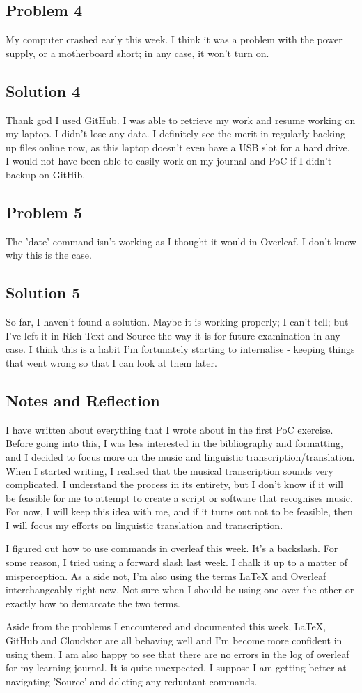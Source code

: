 \documentclass{article}
\begin{document}
\subsection{Problem 4}
My computer crashed early this week. I think it was a problem with the power supply, or a motherboard short; in any case, it won't turn on.
\subsection{Solution 4}
Thank god I used GitHub. I was able to retrieve my work and resume working on my laptop. I didn't lose any data. I definitely see the merit in regularly backing up files online now, as this laptop doesn't even have a USB slot for a hard drive. I would not have been able to easily work on my journal and PoC if I didn't backup on GitHib.
\subsection{Problem 5}
The 'date' command isn't working as I thought it would in Overleaf. I don't know why this is the case.
\subsection{Solution 5}
So far, I haven't found a solution. Maybe it is working properly; I can't tell; but I've left it in Rich Text and Source the way it is for future examination in any case. I think this is a habit I'm fortunately starting to internalise - keeping things that went wrong so that I can look at them later.
\subsection{Notes and Reflection}
I have written about everything that I wrote about in the first PoC exercise. Before going into this, I was less interested in the bibliography and formatting, and I decided to focus more on the music and linguistic transcription/translation. When I started writing, I realised that the musical transcription sounds very complicated. I understand the process in its entirety, but I don’t know if it will be feasible for me to attempt to create a script or software that recognises music. For now, I will keep this idea with me, and if it turns out not to be feasible, then I will focus my efforts on linguistic translation and transcription.

I figured out how to use commands in overleaf this week. It's a backslash. For some reason, I tried using a forward slash last week. I chalk it up to a matter of misperception. As a side not, I'm also using the terms LaTeX and Overleaf interchangeably right now. Not sure when I should be using one over the other or exactly how to demarcate the two terms.

Aside from the problems I encountered and documented this week, LaTeX, GitHub and Cloudstor are all behaving well and I’m become more confident in using them. I am also happy to see that there are no errors in the log of overleaf for my learning journal. It is quite unexpected. I suppose I am getting better at navigating 'Source' and deleting any reduntant commands.
\end{document}
